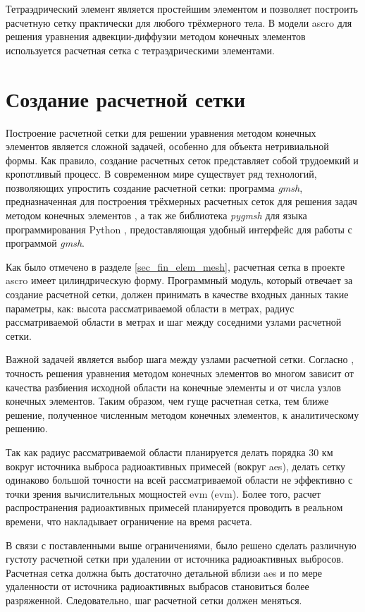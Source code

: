 Тетраэдрический элемент является простейшим элементом и позволяет построить расчетную сетку практически для любого 
трёхмерного тела. В модели \ac{ascro} для решения уравнения адвекции-диффузии методом конечных элементов используется 
расчетная сетка с тетраэдрическими элементами.

\section{Создание расчетной сетки}
\label{sec_mesh_gen}

Построение расчетной сетки для решении уравнения методом конечных элементов является сложной задачей, особенно для 
объекта нетривиальной формы. Как правило, создание расчетных сеток представляет собой трудоемкий и кропотливый процесс. 
В современном мире существует ряд технологий, позволяющих упростить создание расчетной сетки: программа \textit{gmsh}, 
предназначенная для построения трёхмерных расчетных сеток для решения задач методом конечных элементов \cite{gmsh_man}, 
а так же библиотека \textit{pygmsh} для языка программирования Python \cite{pygmsh_doc}, предоставляющая удобный 
интерфейс для работы с программой \textit{gmsh}.

Как было отмечено в разделе \ref{sec_fin_elem_mesh}, расчетная сетка в проекте \ac{ascro} имеет цилиндрическую форму. 
Программный модуль, который отвечает за создание расчетной сетки, должен принимать в качестве входных данных такие 
параметры, как: высота рассматриваемой области в метрах, радиус рассматриваемой области в метрах и шаг между соседними 
узлами расчетной сетки.

Важной задачей является выбор шага между узлами расчетной сетки. Согласно \cite{mke}, точность решения уравнения методом 
конечных элементов во многом зависит от качества разбиения исходной области на конечные элементы и от числа узлов 
конечных элементов. Таким образом, чем гуще расчетная сетка, тем ближе решение, полученное численным методом конечных 
элементов, к аналитическому решению. 

Так как радиус рассматриваемой области планируется делать порядка 30 км вокруг источника выброса радиоактивных примесей 
(вокруг \ac{aes}), делать сетку одинаково большой точности на всей рассматриваемой области не эффективно с точки зрения 
вычислительных мощностей \ac{evm} (\acl{evm}). Более того, расчет распространения радиоактивных примесей планируется 
проводить в реальном времени, что накладывает ограничение на время расчета. 

В связи с поставленными выше ограничениями, было решено сделать различную густоту расчетной сетки при удалении от 
источника радиоактивных выбросов. Расчетная сетка должна быть достаточно детальной вблизи \ac{aes} и по мере удаленности 
от источника радиоактивных выбрасов становиться более разряженной. Следовательно, шаг расчетной сетки должен меняться.

